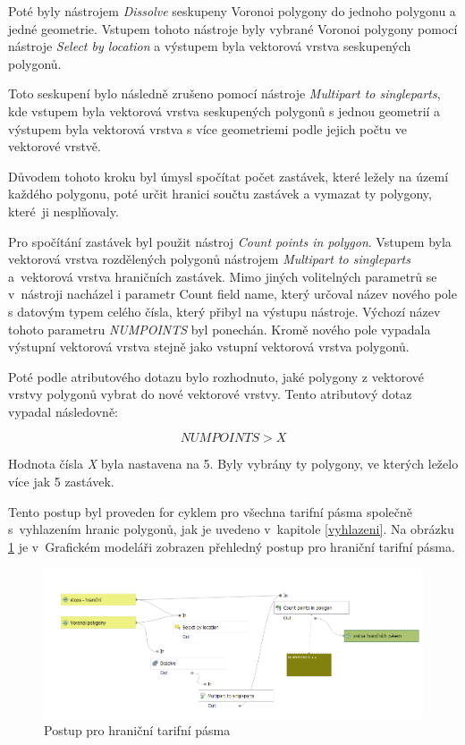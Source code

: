 Poté byly nástrojem \textit{Dissolve} seskupeny Voronoi polygony do jednoho polygonu a jedné geometrie. Vstupem tohoto nástroje byly
vybrané Voronoi polygony pomocí nástroje \textit{Select by location} a výstupem byla vektorová vrstva seskupených polygonů.

Toto seskupení bylo následně zrušeno pomocí nástroje \textit{Multipart to singleparts}, kde vstupem byla vektorová vrstva 
seskupených polygonů s jednou geometrií a vý\-stupem byla vektorová vrstva s více geometriemi podle jejich počtu ve vektorové vrstvě.

Důvodem tohoto kroku byl úmysl spočítat počet zastávek, které ležely na území každého polygonu, poté určit hranici
součtu zastávek a vymazat ty polygony, které~ji nesplňovaly.

Pro spočítání zastávek byl použit nástroj \textit{Count points in polygon}. Vstupem byla vektorová vrstva 
rozdělených polygonů nástrojem \textit{Multipart to singleparts}
a~vektorová vrstva hraničních zastávek. Mimo jiných volitelných parametrů se v~nástroji nacházel i parametr 
Count field name, který určoval název nového pole s datovým typem celého čísla,
který přibyl na výstupu nástroje. Výchozí název tohoto paramet\-ru \textit{NUMPOINTS} byl ponechán. 
Kromě nového pole vypadala vý\-stupní vektorová vrstva stejně jako vstupní vektorová vrstva polygonů.

Poté podle atributového dotazu bylo rozhodnuto, jaké polygony z vektorové vrstvy polygonů vybrat do nové vektorové vrstvy.
Tento atributový dotaz vypadal následovně: 

\[NUMPOINTS > X\]

Hodnota čísla \textit{X} byla nastavena na 5. Byly vybrány ty polygony, ve kterých leželo více jak 5 zastávek.

Tento postup byl proveden for cyklem pro všechna tarifní pásma společně s~vy\-hlazením hranic polygonů,
jak je uvedeno v~kapitole \ref{vyhlazeni}. Na obrázku \ref{fig:postup-border-zones} je v~Grafickém modeláři zobrazen
přehledný postup pro hraniční tarifní pásma. 

\begin{figure}[H] \centering
    \includegraphics[width=400pt]{./pictures/postup-border-zones.png}
    \caption[Postup pro hraniční tarifní pásma]{Postup pro hraniční tarifní pásma}
	\label{fig:postup-border-zones}              
\end{figure}

